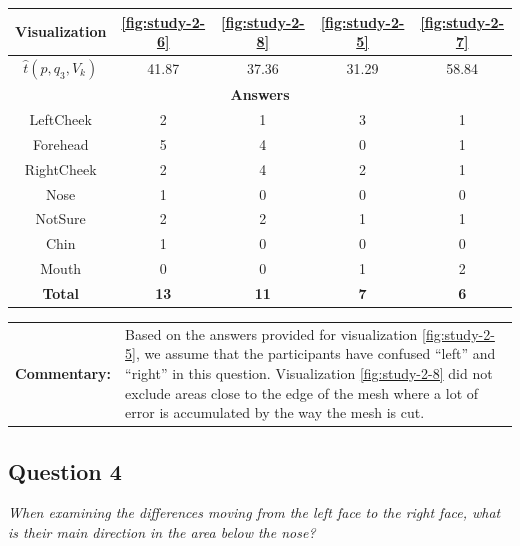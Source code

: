 \begin{center}
\begin{tabular}{| c | c | c | c | c |}
	\hline
	Visualization & \ref{fig:study-2-6} & \ref{fig:study-2-8} & \ref{fig:study-2-5} & \ref{fig:study-2-7}\\ \hline
	\(\widehat{t}(p, q_3, V_k)\) & 41.87 & 37.36 & 31.29 & 58.84\\ \hline
	\multicolumn{5}{|c|}{\bf Answers} \\ \hline
	LeftCheek & 2 & 1 & 3 & 1\\ \hline
	Forehead & 5 & 4 & 0 & 1\\ \hline
	\rowcolor{yellow!30} RightCheek & 2 & 4 & 2 & 1\\ \hline
	Nose & 1 & 0 & 0 & 0\\ \hline
	NotSure & 2 & 2 & 1 & 1\\ \hline
	Chin & 1 & 0 & 0 & 0\\ \hline
	Mouth & 0 & 0 & 1 & 2\\ \hline
	{\bf Total} & {\bf 13} & {\bf 11} & {\bf 7} & {\bf 6}\\ \hline
\end{tabular}
\end{center}

\begin{tabular}{l p{}}
	{\bf Commentary:} & Based on the answers provided for visualization \ref{fig:study-2-5}, we assume that the participants have confused ``left'' and ``right'' in this question. Visualization \ref{fig:study-2-8} did not exclude areas close to the edge of the mesh where a lot of error is accumulated by the way the mesh is cut. \\
\end{tabular}

\clearpage

\subsection{Question 4}
\label{attch:complete_study_results-question4}

\begin{center}{\it When examining the differences moving from the left face to the right face, what is their main direction in the area below the nose?}\end{center}

